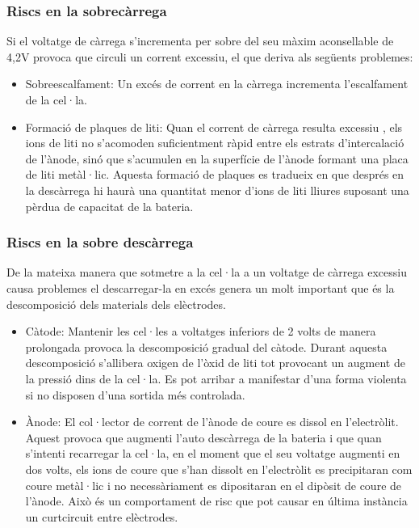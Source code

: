 \subsubsection{Riscs en la sobrecàrrega}
Si el voltatge de càrrega s'incrementa per sobre del seu màxim aconsellable de 4,2V provoca que circuli un corrent excessiu, el que deriva als següents problemes:
\begin{itemize}
    \item Sobreescalfament: Un excés de corrent en la càrrega incrementa \newline l'escalfament de la cel·la. 
    \item Formació de plaques de liti: Quan el corrent de càrrega resulta excessiu , els ions de liti no s'acomoden suficientment ràpid entre els estrats d'intercalació de l'ànode, sinó que s'acumulen en la superfície de l'ànode formant una placa de liti metàl·lic. Aquesta formació de plaques es tradueix en que després en la descàrrega hi haurà una quantitat menor d'ions de liti lliures suposant una pèrdua de capacitat de la bateria. 
\end{itemize}

\subsubsection{Riscs en la sobre descàrrega}
De la mateixa manera que sotmetre a la cel·la a un voltatge de càrrega excessiu causa problemes el descarregar-la en excés genera un molt important que és la descomposició dels materials dels elèctrodes.
\begin{itemize}
    \item Càtode: Mantenir les cel·les a voltatges inferiors de 2 volts de manera prolongada provoca la descomposició gradual del càtode. Durant aquesta descomposició s'allibera oxigen de l'òxid de liti tot provocant un augment de la pressió dins de la cel·la. Es pot arribar a manifestar d'una forma violenta si no disposen d'una sortida més controlada.   
   \item Ànode: El col·lector de corrent de l'ànode de coure es dissol en \newline l'electròlit. Aquest provoca que augmenti l'auto descàrrega de la bateria i que quan s'intenti recarregar la cel·la, en el moment que el seu voltatge augmenti en dos volts, els ions de coure que s'han dissolt en l'electròlit es precipitaran com coure metàl·lic i no necessàriament es dipositaran en el dipòsit de coure de l'ànode. Això és un comportament de risc que pot causar en última instància un curtcircuit entre elèctrodes.

\end{itemize}

